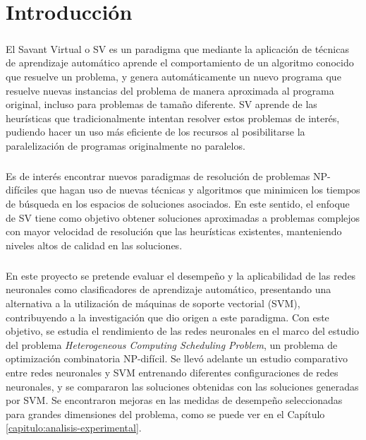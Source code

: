 \chapter{Introducción} \label{section-introduccion}

\paragraph{} El Savant Virtual o SV es un paradigma que mediante la aplicación de técnicas de aprendizaje automático aprende el comportamiento de un algoritmo conocido que resuelve un problema, y genera automáticamente un nuevo programa que resuelve nuevas instancias del problema de manera aproximada al programa original, incluso para problemas de tamaño diferente.
SV aprende de las heurísticas que tradicionalmente intentan resolver estos problemas de interés, pudiendo hacer un uso más eficiente de los recursos al posibilitarse la paralelización de programas originalmente no paralelos.

\paragraph{} Es de interés encontrar nuevos paradigmas de resolución de problemas NP-difíciles que hagan uso de nuevas técnicas y algoritmos que minimicen los tiempos de búsqueda en los espacios de soluciones asociados.
En este sentido, el enfoque de SV tiene como objetivo obtener soluciones aproximadas a problemas complejos con mayor velocidad de resolución que las heurísticas existentes, manteniendo niveles altos de calidad en las soluciones. 

\paragraph{} En este proyecto se pretende evaluar el desempeño y la aplicabilidad de las redes neuronales como clasificadores de aprendizaje automático, presentando una alternativa a la utilización de máquinas de soporte vectorial (SVM), contribuyendo a la investigación que dio origen a este paradigma.
Con este objetivo, se estudia el rendimiento de las redes neuronales en el marco del estudio del problema \textit{Heterogeneous Computing Scheduling Problem}, un problema de optimización combinatoria NP-difícil.
Se llevó adelante un estudio comparativo entre redes neuronales y SVM entrenando diferentes configuraciones de redes neuronales, y se compararon las soluciones obtenidas con las soluciones generadas por SVM. Se encontraron mejoras en las medidas de desempeño seleccionadas para grandes dimensiones del problema, como se puede ver en el Capítulo \ref{capitulo:analisis-experimental}.

